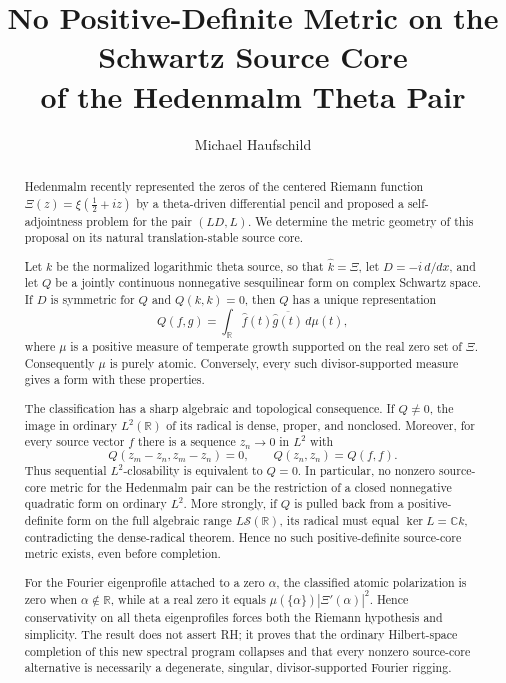 \documentclass[11pt]{article}
\title{No Positive-Definite Metric on the Schwartz Source Core\\
of the Hedenmalm Theta Pair}
\author{Michael Haufschild}
\date{}
\newcommand{\C}{\mathbb C}
\newcommand{\R}{\mathbb R}
\begin{document}
\maketitle

\begin{abstract}
Hedenmalm recently represented the zeros of the centered Riemann function
\(\Xi(z)=\xi(\frac12+iz)\) by a theta-driven differential pencil and proposed a
self-adjointness problem for the pair \((LD,L)\).  We determine the metric geometry of this
proposal on its natural translation-stable source core.

Let \(k\) be the normalized logarithmic theta source, so that \(\widehat{k}=\Xi\), let
\(D=-i\,d/dx\), and let \(Q\) be a jointly continuous nonnegative sesquilinear form on complex
Schwartz space.  If \(D\) is symmetric for \(Q\) and \(Q(k,k)=0\), then \(Q\) has a unique
representation
\[
 Q(f,g)=\int_{\R}\widehat f(t)\overline{\widehat g(t)}\,d\mu(t),
\]
where \(\mu\) is a positive measure of temperate growth supported on the real zero set of
\(\Xi\).  Consequently \(\mu\) is purely atomic.  Conversely, every such divisor-supported
measure gives a form with these properties.

The classification has a sharp algebraic and topological consequence.  If \(Q\neq0\), the image in ordinary
\(L^2(\R)\) of its radical is dense, proper, and nonclosed.  Moreover, for every source vector
\(f\) there is a sequence \(z_n\to0\) in \(L^2\) with
\[
 Q(z_m-z_n,z_m-z_n)=0,\qquad Q(z_n,z_n)=Q(f,f).
\]
Thus sequential \(L^2\)-closability is equivalent to \(Q=0\).  In particular, no nonzero
source-core metric for the Hedenmalm pair can be the restriction of a closed nonnegative
quadratic form on ordinary \(L^2\).  More strongly, if \(Q\) is pulled back from a
positive-definite form on the full algebraic range \(L\mathcal S(\R)\), its radical must equal
\(\ker L=\C k\), contradicting the dense-radical theorem.  Hence no such positive-definite
source-core metric exists, even before completion.

For the Fourier eigenprofile attached to a zero \(\alpha\), the classified atomic polarization is
zero when \(\alpha\notin\R\), while at a real zero it equals
\(\mu(\{\alpha\})|\Xi'(\alpha)|^2\).  Hence conservativity on all theta eigenprofiles forces
both the Riemann hypothesis and simplicity.  The result does not assert RH; it proves that the
ordinary Hilbert-space completion of this new spectral program collapses and that every
nonzero source-core alternative is necessarily a degenerate, singular, divisor-supported
Fourier rigging.
\end{abstract}
\end{document}
